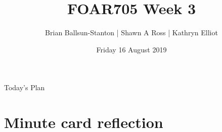 \documentclass[aspectratio=1610, 11pt]{beamer} %
\title{FOAR705 Week 3} %
\author{Brian Ballsun-Stanton | Shawn A Ross | Kathryn Elliot}               %
\institute{Faculty of Arts}         %
\date{Friday 16 August 2019}                 %
\begin{document}

\maketitle

  

\begin{frame}{Today's Plan}
  \tableofcontents
\end{frame}

\section{Minute card reflection}
\end{document}
